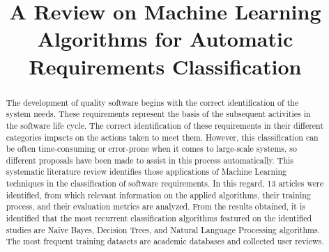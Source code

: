 \documentclass[conference]{IEEEtran}
\begin{document}
\title{A Review on Machine Learning Algorithms for Automatic Requirements Classification}

\author{
\and
{}
\and
{}
}

\maketitle

\begin{abstract}
The development of quality software begins with the correct identification of the system needs. These requirements represent the basis of the subsequent activities in the software life cycle. The correct identification of these requirements in their different categories impacts on the actions taken to meet them. However, this classification can be often time-consuming or error-prone when it comes to large-scale systems, so different proposals have been made to assist in this process automatically. This systematic literature review identifies those applications of Machine Learning techniques in the classification of software requirements. In this regard, 13 articles were identified, from which relevant information on the applied algorithms, their training process, and their evaluation metrics are analyzed. From the results obtained, it is identified that the most recurrent classification algorithms featured on the identified studies are Naïve Bayes, Decision Trees, and Natural Language Processing algorithms. The most frequent training datasets are academic databases and collected user reviews.
\end{abstract}
\end{document}
